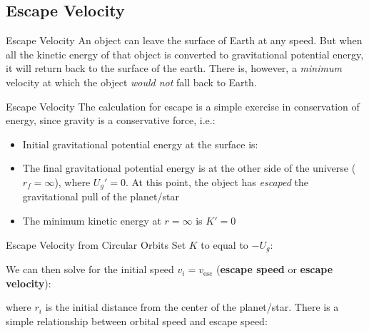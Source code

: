 \documentclass[12pt,compress,aspectratio=169]{beamer}
\begin{document}
\subsection{Escape Velocity}

\begin{frame}{Escape Velocity}
  An object can leave the surface of Earth at any speed. But when all the
  kinetic energy of that object is converted to gravitational potential energy,
  it will return back to the surface of the earth. There is, however, a
  \emph{minimum} velocity at which the object \emph{would not} fall back to
  Earth.
\end{frame}



\begin{frame}{Escape Velocity}
  The calculation for escape is a simple exercise in conservation of energy,
  since gravity is a conservative force, i.e.:

  \begin{itemize}
  \item\vspace{-.1in}Initial gravitational potential energy at the surface is:

  \item The final gravitational potential energy is at the other side of the
    universe ($r_f=\infty$), where $U_g'=0$. At this point, the object has
    \emph{escaped} the gravitational pull of the planet/star
  \item The minimum kinetic energy at $r=\infty$ is $K'=0$
  \end{itemize}
\end{frame}



\begin{frame}{Escape Velocity from Circular Orbits}
  Set $K$ to equal to $-U_g$:


  We can then solve for the initial speed $v_i=v_\text{esc}$
  (\textbf{escape speed} or \textbf{escape velocity}):


  where $r_i$ is the initial distance from the center of the planet/star.
  There is a simple relationship between orbital speed and escape speed:

\end{frame}
\end{document}

